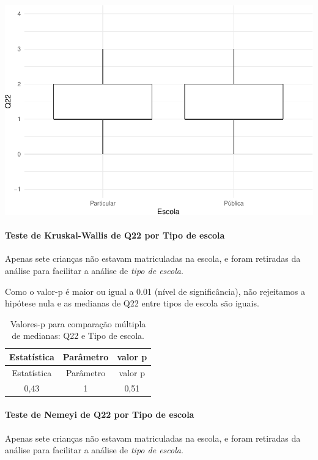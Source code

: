 \documentclass[]{article}
\let\oldparagraph\paragraph
\renewcommand{\paragraph}[1]{\oldparagraph{#1}\mbox{}}
\begin{document}
\begin{center}\includegraphics[width=0.75\linewidth]{relatorio_covid19_files/figure-latex/unnamed-chunk-529-1} \end{center}

\hypertarget{teste-de-kruskal-wallis-de-q22-por-tipo-de-escola}{%
\paragraph{Teste de Kruskal-Wallis de Q22 por Tipo de escola}\label{teste-de-kruskal-wallis-de-q22-por-tipo-de-escola}}

Apenas sete crianças não estavam matriculadas na escola, e foram retiradas da análise para facilitar a análise de \emph{tipo de escola}.

Como o valor-p é maior ou igual a 0.01 (nível de significância), não rejeitamos a hipótese nula e as medianas de Q22 entre tipos de escola são iguais.

\begin{longtable}[]{@{}ccc@{}}
\caption{\label{tab:unnamed-chunk-531}Valores-p para comparação múltipla de medianas: Q22 e Tipo de escola.}\tabularnewline
\toprule
Estatística & Parâmetro & valor p\tabularnewline
\midrule
\endfirsthead
\toprule
Estatística & Parâmetro & valor p\tabularnewline
\midrule
\endhead
0,43 & 1 & 0,51\tabularnewline
\bottomrule
\end{longtable}

\hypertarget{teste-de-nemeyi-de-q22-por-tipo-de-escola}{%
\paragraph{Teste de Nemeyi de Q22 por Tipo de escola}\label{teste-de-nemeyi-de-q22-por-tipo-de-escola}}

Apenas sete crianças não estavam matriculadas na escola, e foram retiradas da análise para facilitar a análise de \emph{tipo de escola}.
\end{document}
